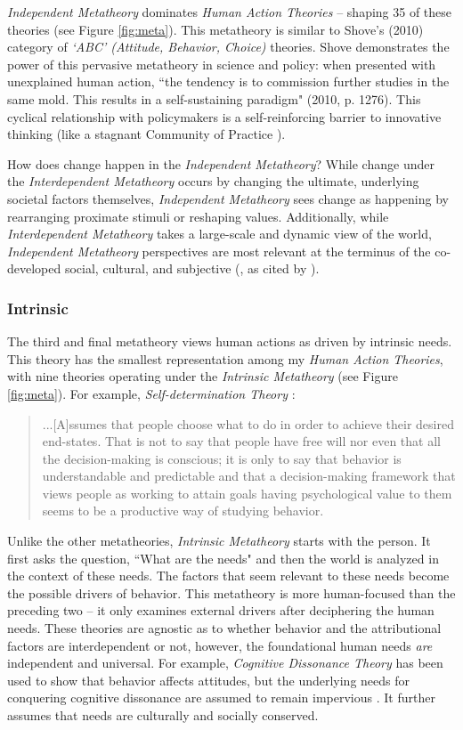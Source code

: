 \documentclass[12 pt]{article}
\begin{document}
	\textit{Independent Metatheory} dominates \textit{Human Action Theories} -- shaping 35 of these theories (see Figure \ref{fig:meta}). This metatheory is similar to Shove's (2010) category of \textit{`ABC' (Attitude, Behavior, Choice)} theories. Shove demonstrates the power of this pervasive metatheory in science and policy: when presented with unexplained human action, ``the tendency is to commission further studies in the same mold. This results in a self-sustaining paradigm" (2010, p. 1276). This cyclical relationship with policymakers is a self-reinforcing barrier to innovative thinking (like a stagnant Community of Practice \parencite{Wenger1998}). 
	
	How does change happen in the \textit{Independent Metatheory}? While change under the \textit{Interdependent Metatheory} occurs by changing the ultimate, underlying societal factors themselves, \textit{Independent Metatheory} sees change as happening by rearranging proximate stimuli or reshaping values. Additionally, while \textit{Interdependent Metatheory} takes a large-scale and dynamic view of the world, \textit{Independent Metatheory} perspectives are most relevant at the terminus of the co-developed social, cultural, and subjective (\textcite{Uzzell2008}, as cited by \textcite{Shove2010}). 

	\subsubsection{Intrinsic}
	The third and final metatheory views human actions as driven by intrinsic needs. This theory has the smallest representation among my \textit{Human Action Theories}, with nine theories operating under the \textit{Intrinsic Metatheory} (see Figure \ref{fig:meta}). For example, \textit{Self-determination Theory} \parencite[][p. 132-3]{Deci1976}:  \blockquote{...[A]ssumes that people choose what to
		do in order to achieve their desired end-states. That is not to say that
		people have free will nor even that all the decision-making is conscious;
		it is only to say that behavior is understandable and predictable and that
		a decision-making framework that views people as working to attain goals having psychological value to them seems to be a productive way of studying behavior.} 
	 Unlike the other metatheories, \textit{Intrinsic Metatheory} starts with the person. It first asks the question, ``What are the needs" and then the world is analyzed in the context of these needs. The factors that seem relevant to these needs become the possible drivers of behavior. This metatheory is more human-focused than the preceding two -- it only examines external drivers after deciphering the human needs. These  theories are agnostic as to whether behavior and the attributional factors are interdependent or not, however, the foundational human needs \textit{are} independent and universal. For example, \textit{Cognitive Dissonance Theory} has been used to show that behavior affects attitudes, but the underlying needs for conquering cognitive dissonance are assumed to remain impervious \parencite{Festinger1959}. It further assumes that needs are culturally and socially conserved. 
	 
\end{document}
